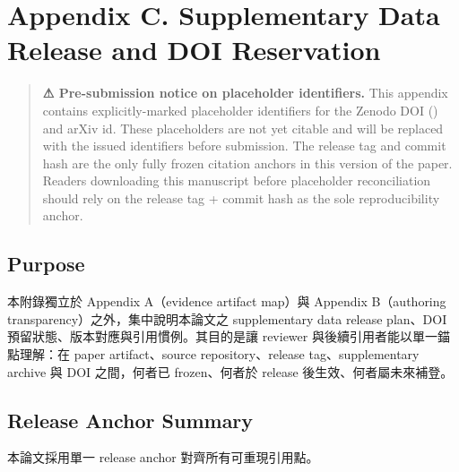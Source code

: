 \documentclass[a4paper,fontset=none]{ctexart}
\begin{document}
\medskip

\section*{Appendix C. Supplementary Data Release and DOI Reservation}

\begin{quote}
\textbf{⚠ Pre-submission notice on placeholder identifiers.} This appendix contains explicitly-marked placeholder identifiers for the Zenodo DOI (\texttt{}) and arXiv id. These placeholders are not yet citable and will be replaced with the issued identifiers before submission. The release tag \texttt{} and commit hash \texttt{} are the only fully frozen citation anchors in this version of the paper. Readers downloading this manuscript before placeholder reconciliation should rely on the release tag + commit hash as the sole reproducibility anchor.
\end{quote}

\subsection*{Purpose}

本附錄獨立於 Appendix A（evidence artifact map）與 Appendix B（authoring transparency）之外，集中說明本論文之 supplementary data release plan、DOI 預留狀態、版本對應與引用慣例。其目的是讓 reviewer 與後續引用者能以單一錨點理解：在 paper artifact、source repository、release tag、supplementary archive 與 DOI 之間，何者已 frozen、何者於 release 後生效、何者屬未來補登。

\subsection*{Release Anchor Summary}

本論文採用單一 release anchor 對齊所有可重現引用點。
\end{document}
